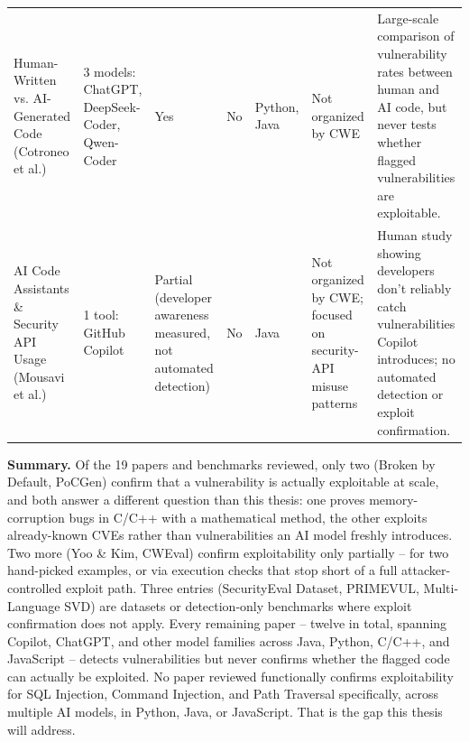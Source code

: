 \documentclass[10pt]{article}
\begin{document}
\begin{landscape}
\begin{longtable}{
  P{2.4cm}
  P{3.4cm}
  P{1.6cm}
  P{1.8cm}
  P{2.2cm}
  P{3.6cm}
  P{5.2cm}
}
Human-Written vs. AI-Generated Code (Cotroneo et al.)
&
3 models: ChatGPT, DeepSeek-Coder, Qwen-Coder
&
Yes
&
No
&
Python, Java
&
Not organized by CWE
&
Large-scale comparison of vulnerability rates between human and AI code, but never tests whether flagged vulnerabilities are exploitable.
\\[4pt]

AI Code Assistants \& Security API Usage (Mousavi et al.)
&
1 tool: GitHub Copilot
&
Partial (developer awareness measured, not automated detection)
&
No
&
Java
&
Not organized by CWE; focused on security-API misuse patterns
&
Human study showing developers don't reliably catch vulnerabilities Copilot introduces; no automated detection or exploit confirmation.
\\

\end{longtable}

\vspace{6pt}
\textbf{Summary.} Of the 19 papers and benchmarks reviewed, only two (Broken by Default, PoCGen) confirm that a vulnerability is actually exploitable at scale, and both answer a different question than this thesis: one proves memory-corruption bugs in C/C++ with a mathematical method, the other exploits already-known CVEs rather than vulnerabilities an AI model freshly introduces. Two more (Yoo \& Kim, CWEval) confirm exploitability only partially -- for two hand-picked examples, or via execution checks that stop short of a full attacker-controlled exploit path. Three entries (SecurityEval Dataset, PRIMEVUL, Multi-Language SVD) are datasets or detection-only benchmarks where exploit confirmation does not apply. Every remaining paper -- twelve in total, spanning Copilot, ChatGPT, and other model families across Java, Python, C/C++, and JavaScript -- detects vulnerabilities but never confirms whether the flagged code can actually be exploited. No paper reviewed functionally confirms exploitability for SQL Injection, Command Injection, and Path Traversal specifically, across multiple AI models, in Python, Java, or JavaScript. That is the gap this thesis will address.

\end{landscape}
\end{document}
